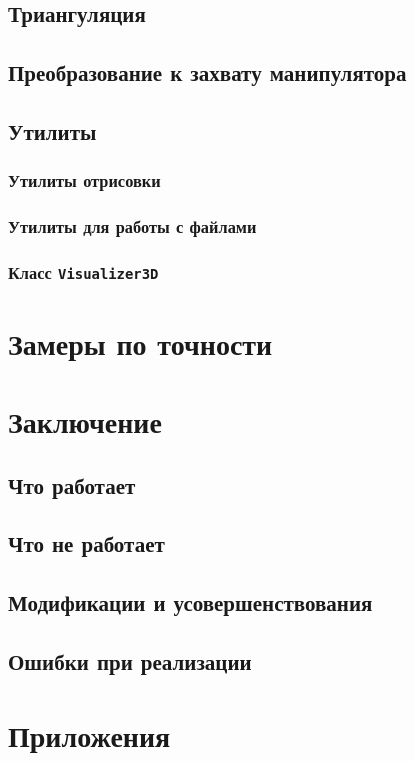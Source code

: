 \documentclass[12pt, a4paper]{article}
\begin{document}
\subsection{Триангуляция}

\subsection{Преобразование к захвату манипулятора}

\subsection{Утилиты}
\subsubsection{Утилиты отрисовки}
\subsubsection{Утилиты для работы с файлами}
\subsubsection{Класс \texttt{Visualizer3D}}

\section{Замеры по точности}


\section{Заключение}

\subsection{Что работает}
\subsection{Что не работает}
\subsection{Модификации и усовершенствования}
\subsection{Ошибки при реализации}

\section{Приложения}
\end{document}
